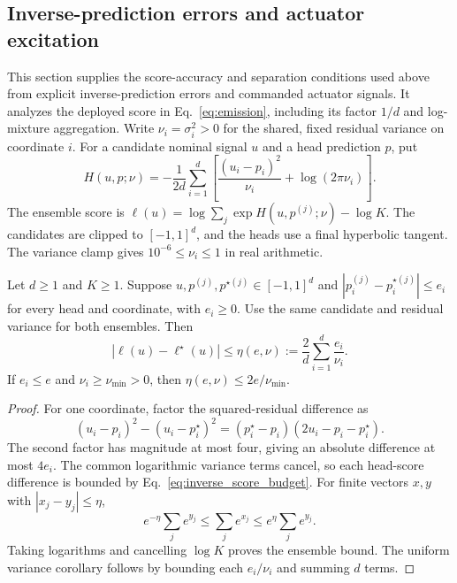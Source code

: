 \subsection{Inverse-prediction errors and actuator excitation}
\label{app:inverse_evidence}

This section supplies the score-accuracy and separation conditions used above from explicit inverse-prediction errors and commanded actuator signals.
It analyzes the deployed score in Eq.~\eqref{eq:emission}, including its factor $1/d$ and log-mixture aggregation.
Write $\nu_i=\sigma_i^2>0$ for the shared, fixed residual variance on coordinate $i$.
For a candidate nominal signal $u$ and a head prediction $p$, put
\begin{equation}
 H(u,p;\nu)=-\frac{1}{2d}\sum_{i=1}^d
 \left[\frac{(u_i-p_i)^2}{\nu_i}+\log(2\pi\nu_i)\right].
 \label{eq:inverse_head_score}
\end{equation}
The ensemble score is $\ell(u)=\log\sum_j\exp H(u,p^{(j)};\nu)-\log K$.
The candidates are clipped to $[-1,1]^d$, and the heads use a final hyperbolic tangent.
The variance clamp gives $10^{-6}\le\nu_i\le1$ in real arithmetic.

\begin{proposition}
\label{prop:inverse_score_error}
Let $d\ge1$ and $K\ge1$. Suppose $u,p^{(j)},p^{\star(j)}\in[-1,1]^d$ and
$|p_i^{(j)}-p_i^{\star(j)}|\le e_i$ for every head and coordinate, with $e_i\ge0$.
Use the same candidate and residual variance for both ensembles. Then
\begin{equation}
 |\ell(u)-\ell^\star(u)|\le
 \eta(e,\nu):=\frac{2}{d}\sum_{i=1}^d\frac{e_i}{\nu_i}.
 \label{eq:inverse_score_budget}
\end{equation}
If $e_i\le e$ and $\nu_i\ge\nu_{\min}>0$, then $\eta(e,\nu)\le2e/\nu_{\min}$.
\end{proposition}

\begin{proof}
For one coordinate, factor the squared-residual difference as
\begin{equation}
 (u_i-p_i)^2-(u_i-p_i^\star)^2
 =(p_i^\star-p_i)(2u_i-p_i-p_i^\star).
\end{equation}
The second factor has magnitude at most four, giving an absolute difference at most $4e_i$.
The common logarithmic variance terms cancel, so each head-score difference is bounded by Eq.~\eqref{eq:inverse_score_budget}.
For finite vectors $x,y$ with $|x_j-y_j|\le\eta$,
\begin{equation}
 e^{-\eta}\sum_j e^{y_j}\le\sum_j e^{x_j}\le e^{\eta}\sum_j e^{y_j}.
\end{equation}
Taking logarithms and cancelling $\log K$ proves the ensemble bound.
The uniform variance corollary follows by bounding each $e_i/\nu_i$ and summing $d$ terms.
\end{proof}

